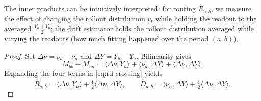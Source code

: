 \begin{remark}
The inner products can be intuitively interpreted: for routing $\widehat R_{a:b}$, we measure the effect of changing the rollout distribution $v_t$ while holding the readout to the averaged $\frac{Y_a + Y_b}{2}$; the drift estimator holds the rollout distribution averaged while varying the readouts (how much fitting happened over the period $(a,b)$).
\end{remark}
\begin{proof}
Set $\Delta\nu=\nu_b-\nu_a$ and $\Delta Y=Y_b-Y_a$. Bilinearity gives
\[
 M_{bb}-M_{aa}
 =\langle\Delta\nu,Y_a\rangle+\langle\nu_a,\Delta Y\rangle
  +\langle\Delta\nu,\Delta Y\rangle.
\]
Expanding the four terms in \cref{eq:rd-crossing} yields
\[
 \widehat R_{a:b}=\langle\Delta\nu,Y_a\rangle+\tfrac12\langle\Delta\nu,\Delta Y\rangle,
 \qquad
 \widehat D_{a:b}=\langle\nu_a,\Delta Y\rangle+\tfrac12\langle\Delta\nu,\Delta Y\rangle.
\]

\end{proof}

